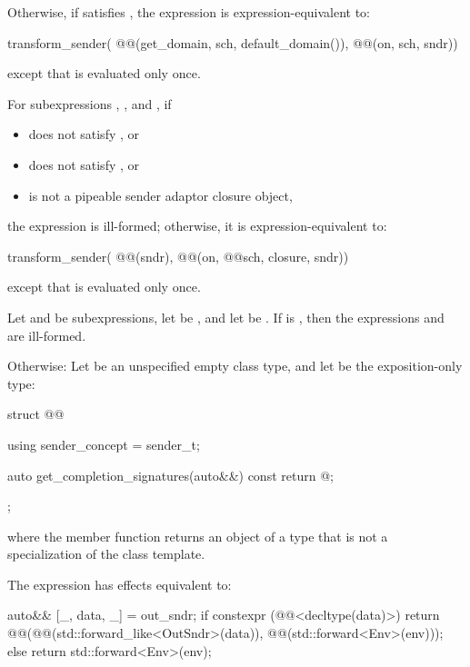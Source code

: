\pnum
Otherwise, if  satisfies ,
the expression  is expression-equivalent to:
\begin{codeblock}
transform_sender(
  @@(get_domain, sch, default_domain()),
  @@(on, sch, sndr))
\end{codeblock}
except that  is evaluated only once.

\pnum
For subexpressions , , and , if
\begin{itemize}
\item
{} does not satisfy , or
\item
{} does not satisfy , or
\item
{} is not a pipeable sender adaptor closure object,
\end{itemize}
the expression  is ill-formed;
otherwise, it is expression-equivalent to:
\begin{codeblock}
transform_sender(
  @@(sndr),
  @@(on, @@{sch, closure}, sndr))
\end{codeblock}
except that  is evaluated only once.

\pnum
Let  and  be subexpressions,
let  be , and
let  be .
If  is ,
then the expressions  and
 are ill-formed.

\pnum
Otherwise:
Let  be an unspecified empty class type, and
let  be the exposition-only type:
\begin{codeblock}
struct @@ {
  using sender_concept = sender_t;

  auto get_completion_signatures(auto&&) const {
    return @\seebelow@;
  }
};
\end{codeblock}
where the member function  returns
an object of a type that is not
a specialization of the  class template.

\pnum
The expression 
has effects equivalent to:
\begin{codeblock}
auto&& [_, data, _] = out_sndr;
if constexpr (@@<decltype(data)>) {
  return @@(@@(std::forward_like<OutSndr>(data)), @@(std::forward<Env>(env)));
} else {
  return std::forward<Env>(env);
}
\end{codeblock}

